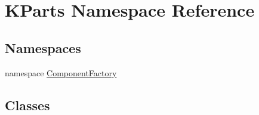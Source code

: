 \hypertarget{namespaceKParts}{\section{\-K\-Parts \-Namespace \-Reference}
\label{namespaceKParts}
}
\subsection*{\-Namespaces}
\begin{DoxyCompactItemize}
\item 
namespace \hyperlink{namespaceKParts_1_1ComponentFactory}{\-Component\-Factory}
\end{DoxyCompactItemize}
\subsection*{\-Classes}
